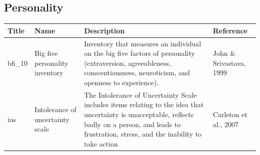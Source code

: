 \documentclass[]{book}
\begin{document}
\hypertarget{personality}{%
\subsection{Personality}\label{personality}}

\begin{longtable}[]{@{}llll@{}}
\toprule
\begin{minipage}[b]{0.22\columnwidth}\raggedright
Title\strut
\end{minipage} & \begin{minipage}[b]{0.27\columnwidth}\raggedright
Name\strut
\end{minipage} & \begin{minipage}[b]{0.22\columnwidth}\raggedright
Description\strut
\end{minipage} & \begin{minipage}[b]{0.18\columnwidth}\raggedright
Reference\strut
\end{minipage}\tabularnewline
\midrule
\endhead
\begin{minipage}[t]{0.22\columnwidth}\raggedright
bfi\_10\strut
\end{minipage} & \begin{minipage}[t]{0.27\columnwidth}\raggedright
Big five personality inventory\strut
\end{minipage} & \begin{minipage}[t]{0.22\columnwidth}\raggedright
Inventory that measures an individual on the big five factors of personality (extraversion, agreeableness, conscentiousness, neuroticism, and openness to experience).\strut
\end{minipage} & \begin{minipage}[t]{0.18\columnwidth}\raggedright
John \& Srivastava, 1999\strut
\end{minipage}\tabularnewline
\begin{minipage}[t]{0.22\columnwidth}\raggedright
ius\strut
\end{minipage} & \begin{minipage}[t]{0.27\columnwidth}\raggedright
Intolerance of uncertainty scale\strut
\end{minipage} & \begin{minipage}[t]{0.22\columnwidth}\raggedright
The Intolerance of Uncertainty Scale includes items relating to the idea that uncertainty is unacceptable, reflects badly on a person, and leads to frustration, stress, and the inability to take action\strut
\end{minipage} & \begin{minipage}[t]{0.18\columnwidth}\raggedright
Carleton et al., 2007\strut
\end{minipage}\tabularnewline
\bottomrule
\end{longtable}
\end{document}
